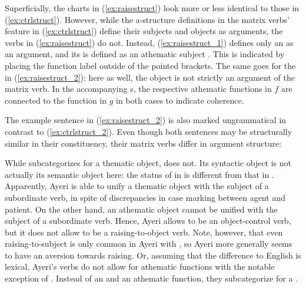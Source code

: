 Superficially, the charts in (\ref{ex:raisestruct}) look more or less identical
to those in (\ref{ex:ctrlstruct}). However, while the a-structure definitions
in the matrix verbs' \Pred{} feature in (\ref{ex:ctrlstruct}) define their
subjects and objects as arguments, the verbs in (\ref{ex:raisestruct}) do not.
Instead, (\ref{ex:raisestruct_1}) defines only an \XCompl{} as an argument, and
its \Subj{} is defined as an athematic subject \citep[304--308]{bresnan2016}.
This is indicated by placing the function label outside of the pointed
brackets. The same goes for the \Obj{} in (\ref{ex:raisestruct_2}): here as
well, the object is not strictly an argument of the matrix verb. In the
accompanying \Avm{}s, the respective athematic functions in $f$ are connected
to the \Subj{} function in $g$ in both cases to indicate coherence.

The example sentence in (\ref{ex:raisestruct_2}) is also marked ungrammatical
in contrast to (\ref{ex:ctrlstruct_2}). Even though both sentences may be
structurally similar in their constituency, their matrix verbs differ in
argument structure:

\pex\label{ex:ctrlraisecomp}
\a\label{ex:ctrlraisecomp_octrl}%

\a\label{ex:ctrlraisecomp_raiseo}%
\xe

While  subcategorizes for a thematic object,  does not.
Its syntactic object is not actually its semantic object here: the status of
 in  is different from that in
. Apparently, Ayeri is able to unify a
thematic object with the subject of a subordinate verb, in spite of
discrepancies in case marking between agent and patient. On the other hand, an
athematic object cannot be unified with the subject of a subordinate verb.
Hence, Ayeri allows  to be an object-control verb, but
it does not allow  to be a raising-to-object
verb. Note, however, that even raising-to-subject is only common in Ayeri with
, so Ayeri more generally seems to have an aversion
towards raising. Or, assuming that the difference to English is lexical,
Ayeri's verbs do not allow for athematic functions with the notable exception
of . Instead of an \XCompl{} and an athematic function,
they subcategorize for a \Compl{}.

